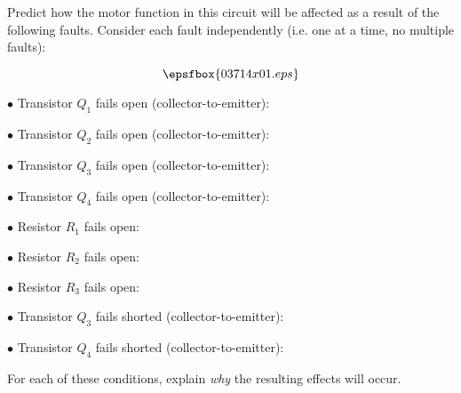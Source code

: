 

Predict how the motor function in this circuit will be affected as a result of the following faults.  Consider each fault independently (i.e. one at a time, no multiple faults):

$$\epsfbox{03714x01.eps}$$

\medskip
\item{$\bullet$} Transistor $Q_1$ fails open (collector-to-emitter):
\vskip 5pt
\item{$\bullet$} Transistor $Q_2$ fails open (collector-to-emitter):
\vskip 5pt
\item{$\bullet$} Transistor $Q_3$ fails open (collector-to-emitter):
\vskip 5pt
\item{$\bullet$} Transistor $Q_4$ fails open (collector-to-emitter):
\vskip 5pt
\item{$\bullet$} Resistor $R_1$ fails open:
\vskip 5pt
\item{$\bullet$} Resistor $R_2$ fails open:
\vskip 5pt
\item{$\bullet$} Resistor $R_3$ fails open:
\vskip 5pt
\item{$\bullet$} Transistor $Q_3$ fails shorted (collector-to-emitter):
\vskip 5pt
\item{$\bullet$} Transistor $Q_4$ fails shorted (collector-to-emitter):
\medskip

For each of these conditions, explain {\it why} the resulting effects will occur.







